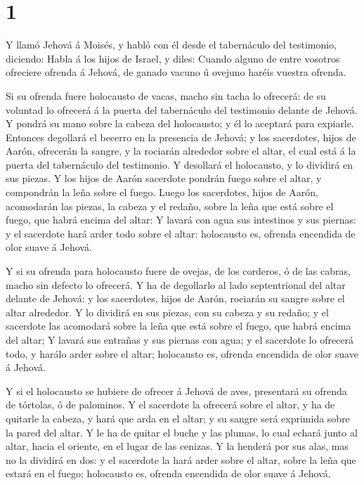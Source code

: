 \hypertarget{section}{%
\section{1}\label{section}}

 Y llamó Jehová á Moisés, y habló con él desde el
tabernáculo del testimonio, diciendo:  Habla á los hijos de
Israel, y diles: Cuando alguno de entre vosotros ofreciere ofrenda á
Jehová, de ganado vacuno ú ovejuno haréis vuestra ofrenda.

 Si su ofrenda fuere holocausto de vacas, macho sin tacha lo
ofrecerá: de su voluntad lo ofrecerá á la puerta del tabernáculo del
testimonio delante de Jehová.  Y pondrá su mano sobre la
cabeza del holocausto; y él lo aceptará para expiarle. 
Entonces degollará el becerro en la presencia de Jehová; y los
sacerdotes, hijos de Aarón, ofrecerán la sangre, y la rociarán alrededor
sobre el altar, el cual está á la puerta del tabernáculo del testimonio.
 Y desollará el holocausto, y lo dividirá en sus piezas.
 Y los hijos de Aarón sacerdote pondrán fuego sobre el
altar, y compondrán la leña sobre el fuego.  Luego los
sacerdotes, hijos de Aarón, acomodarán las piezas, la cabeza y el
redaño, sobre la leña que está sobre el fuego, que habrá encima del
altar:  Y lavará con agua sus intestinos y sus piernas: y el
sacerdote hará arder todo sobre el altar: holocausto es, ofrenda
encendida de olor suave á Jehová.

 Y si su ofrenda para holocausto fuere de ovejas, de los
corderos, ó de las cabras, macho sin defecto lo ofrecerá. 
Y ha de degollarlo al lado septentrional del altar delante de Jehová: y
los sacerdotes, hijos de Aarón, rociarán su sangre sobre el altar
alrededor.  Y lo dividirá en sus piezas, con su cabeza y su
redaño; y el sacerdote las acomodará sobre la leña que está sobre el
fuego, que habrá encima del altar;  Y lavará sus entrañas y
sus piernas con agua; y el sacerdote lo ofrecerá todo, y harálo arder
sobre el altar; holocausto es, ofrenda encendida de olor suave á Jehová.

 Y si el holocausto se hubiere de ofrecer á Jehová de aves,
presentará su ofrenda de tórtolas, ó de palominos.  Y el
sacerdote la ofrecerá sobre el altar, y ha de quitarle la cabeza, y hará
que arda en el altar; y su sangre será exprimida sobre la pared del
altar.  Y le ha de quitar el buche y las plumas, lo cual
echará junto al altar, hacia el oriente, en el lugar de las cenizas.
 Y la henderá por sus alas, mas no la dividirá en dos: y el
sacerdote la hará arder sobre el altar, sobre la leña que estará en el
fuego; holocausto es, ofrenda encendida de olor suave á Jehová.

